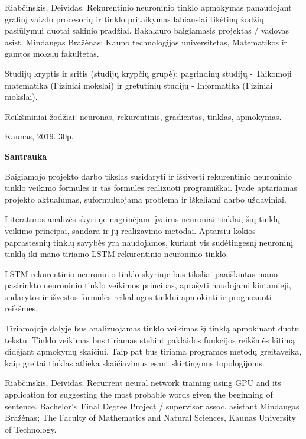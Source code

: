 Riabčinskis, Deividas. Rekurentinio neuroninio tinklo apmokymas panaudojant grafinį vaizdo procesorių ir tinklo pritaikymas labiausiai tikėtinų žodžių pasiūlymui duotai sakinio pradžiai. Bakalauro baigiamasis projektas / vadovas asist. Mindaugas Bražėnas; Kauno technologijos universitetas, Matematikos ir gamtos mokslų fakultetas.

Studijų kryptis ir sritis (studijų krypčių grupė): pagrindinų studijų - Taikomoji matematika (Fiziniai mokslai) ir gretutinių studijų - Informatika (Fiziniai mokslai).

Reikšminiai žodžiai: neuronas, rekurentinis, gradientas, tinklas, apmokymas.

Kaunas, 2019. 30p.%

\begin{center}
\textbf{Santrauka}
\end{center}

Baigiamojo projekto darbo tikslas susidaryti ir išsivesti rekurentinio neuroninio tinklo vei\-ki\-mo formules ir tas formules realizuoti programiškai. Įvade aptariamas projekto aktualumas, suformuluojama problema ir iškeliami darbo uždaviniai.

Literatūros analizės skyriuje nagrinėjami įvairūs neuroniai tinklai, šių tinklų veikimo principai, sandara ir jų realizavimo metodai. Aptarsiu kokios paprastesnių tinklų savybės yra naudojamos, kuriant vis sudėtingesnį neuroninį tinklą iki mano tiriamo LSTM rekurentinio neuroninio tinklo.

LSTM rekurentinio neuroninio tinklo skyriuje bus tiksliai paaiškintas mano pasirinkto neuroninio tinklo veikimos principas, aprašyti naudojami kintamieji, sudarytos ir išvestos formulės reikalingos tinklui apmokinti ir prognozuoti reikšmes.

Tiriamojoje dalyje bus analizuojamas tinklo veikimas šį tinklą apmokinant duotu tekstu. Tinklo veikimas bus tiriamas stebint paklaidos funkcijos reikšmės kitimą didėjant apmokymų skaičiui. Taip pat bus tiriama programos metodų greitaveika, kaip greitai tinklas atlieka skaičiavimus esant skirtingoms topologijoms.



\clearpage

Riabčinskis, Deividas. Recurrent neural network training using GPU and its application for suggesting the most probable words given the beginning of sentence. Bachelor's Final Degree Project / supervisor assoc. asistant Mindaugas Bražėnas; The Faculty of Mathematics and Natural Sciences, Kaunas University of Technology.

